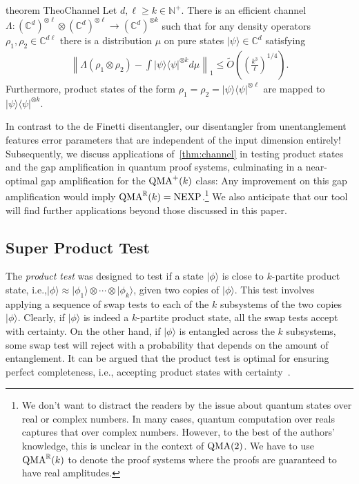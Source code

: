 \documentclass[10pt,a4paper]{article}
\theoremstyle{remark}
\def\to{\rightarrow}
\newcommand{\ie}{i.e.,\xspace}
\newcommand{\R}{{\mathbb R}}
\newcommand{\C}{{\mathbb C}}
\newcommand{\norm}[1]{\ensuremath{\left\lVert #1 \right\rVert}}
\newcommand{\1}[1]{\mathds{1}{[#1]}}
\newcommand{\ket}[1]{\lvert #1\rangle}
\newcommand{\QMA}{\textup{QMA}}
\newcommand{\NEXP}{\textup{NEXP}}
\newcommand{\bra}[1]{\langle#1|}
\numberwithin{equation}{section}
\begin{document}
\begin{restatable}{theorem}
{TheoChannel}\label{thm:channel}
  Let $d,\ell \ge k \in \mathbb{N}^+$.
  There is an efficient channel $\Lambda \colon (\mathbb{C}^{d})^{\otimes \ell}\otimes (\mathbb{C}^{d})^{\otimes \ell} \to (\mathbb{C}^d)^{\otimes k}$
  such that for any density operators $\rho_1, \rho_2 \in \mathbb{C}^{d\ell}$ there is a distribution $\mu$ on pure states $\ket\psi \in \C^d$ satisfying
  \begin{align*}
    \norm{\Lambda(\rho_1 \otimes \rho_2) - \int \ket{\psi}\bra{\psi}^{\otimes k} d\mu}_1 \le \tilde O\left(\left(\frac{k^3}{\ell}\right)^{1/4}\right).
  \end{align*}
  Furthermore, product states of the form $\rho_1 = \rho_2 = \ket{\psi}\bra{\psi}^{\otimes \ell}$ are
  mapped to $\ket{\psi}\bra{\psi}^{\otimes k}$.
\end{restatable}

In contrast to the de Finetti disentangler, our disentangler from unentanglement features
error parameters that are independent of the input dimension entirely! 
%
Subsequently, we discuss applications of~\cref{thm:channel} in testing product states and
the gap amplification in quantum proof systems, culminating in a near-optimal gap amplification for the $\QMA^+(k)$ class: Any improvement on this gap amplification would imply $\QMA^\R(k)=\NEXP$.\footnote{
We don't want to distract the readers by the issue about quantum states over real or complex numbers.
In many cases, quantum computation over reals captures that over complex numbers. However, to the best of the authors' knowledge, this is unclear in the context of $\QMA(2)$. We have to use $\QMA^\R(k)$ to denote the proof systems where the proofs are guaranteed to have real amplitudes.}
%
We also anticipate that our tool will find further applications beyond those discussed in
this paper.

\subsection{Super Product Test}

The \emph{product test} was designed to test if a state $\ket{\phi}$ is close to $k$-partite
product state, \ie $\ket{\phi} \approx \ket{\phi_1} \otimes \cdots \otimes \ket{\phi_k}$, given
two copies of $\ket{\phi}$.
%
This test involves applying a sequence of swap tests to each of the $k$ subsystems of the two
copies $\ket\phi$.
%
Clearly, if $\ket\phi$ is indeed a $k$-partite product state, all the swap tests accept with certainty.
%
On the other hand, if $\ket\phi$ is entangled across the $k$ subsystems, some swap test will reject
with a probability that depends on the amount of entanglement.
%
It can be argued that the product test is optimal for ensuring perfect completeness, i.e., accepting
product states with certainty~\cite{HM13}. 
\end{document}
